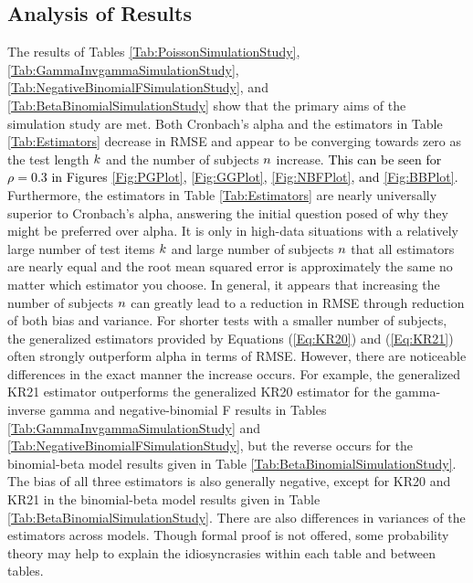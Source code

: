 \documentclass[12pt,epsfig]{article}
\newcommand{\changed}[1]{\textcolor{black}{#1}}
\newcommand{\numsubjects}{\changed{n}}%
\newcommand{\testlength}{\changed{k}}%
\begin{document}
\subsection{Analysis of Results}



The results of Tables \ref{Tab:PoissonSimulationStudy},  \ref{Tab:GammaInvgammaSimulationStudy}, \ref{Tab:NegativeBinomialFSimulationStudy}, and \ref{Tab:BetaBinomialSimulationStudy} show that the primary aims of the simulation study are met. Both Cronbach's alpha and the estimators in Table \ref{Tab:Estimators} decrease in RMSE and appear to be converging towards zero as the test length $\testlength$ and the number of subjects $\numsubjects$ increase. \changed{This can be seen for $\rho = 0.3$ in Figures \ref{Fig:PGPlot}, \ref{Fig:GGPlot}, \ref{Fig:NBFPlot}, and \ref{Fig:BBPlot}.} Furthermore, the estimators in Table \ref{Tab:Estimators} are nearly universally superior to Cronbach's alpha, answering the initial question posed of why they might be preferred over alpha. It is only in high-data situations with a relatively large number of test items $\testlength$ and large number of subjects $\numsubjects$ that all estimators are nearly equal and the root mean squared error is approximately the same no matter which estimator you choose.  In general, it appears that increasing the number of subjects $\numsubjects$ can greatly lead to a reduction in RMSE through reduction of both bias and variance. For shorter tests with a smaller number of subjects, the generalized estimators provided by Equations (\ref{Eq:KR20}) and (\ref{Eq:KR21}) often strongly outperform alpha in terms of RMSE. However, there are noticeable differences in the exact manner the increase occurs. For example, the generalized KR21 estimator outperforms the generalized KR20 estimator for the gamma-inverse gamma and negative-binomial F results in Tables \ref{Tab:GammaInvgammaSimulationStudy} and \ref{Tab:NegativeBinomialFSimulationStudy}, but the reverse occurs for the binomial-beta model results given in Table \ref{Tab:BetaBinomialSimulationStudy}. The bias of all three estimators is also generally negative, except for KR20 and KR21 in the binomial-beta model results given in Table \ref{Tab:BetaBinomialSimulationStudy}.  There are also differences in variances of the estimators across models. Though formal proof is not offered, some probability theory may help to explain the idiosyncrasies within each table and between tables. %
\end{document}
